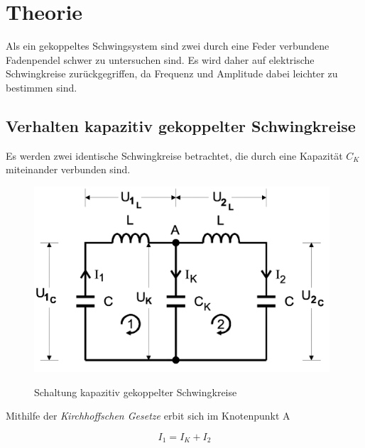 \section{Theorie}
\label{sec:Theorie}

Als ein gekoppeltes Schwingsystem sind zwei durch eine Feder verbundene Fadenpendel schwer zu untersuchen sind.
Es wird daher auf elektrische Schwingkreise zurückgegriffen, da Frequenz und Amplitude dabei leichter zu bestimmen sind.

\subsection {Verhalten kapazitiv gekoppelter Schwingkreise}

Es werden zwei identische Schwingkreise betrachtet, die durch eine Kapazität $C_{K}$ miteinander verbunden sind.

\begin{figure} 
    \centering
    \includegraphics[width=11cm] {pictures/prinzipschaltbild.png} \cite{v355} 
    \caption{Schaltung kapazitiv gekoppelter Schwingkreise}
    \label{fig:prinzipschaltbild}
\end{figure} 

Mithilfe der \textit{Kirchhoffschen Gesetze} erbit sich im Knotenpunkt A

\begin{equation}
    I_{1} = I_{K} + I_{2}
\end{equation}
